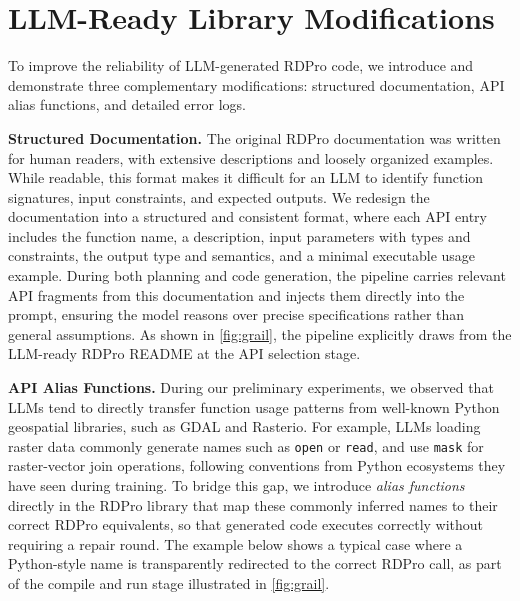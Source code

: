 \section{LLM-Ready Library Modifications}
\label{sec:mod}
To improve the reliability of LLM-generated RDPro code, we introduce and demonstrate three complementary modifications: structured documentation, API alias functions, and detailed error logs.

\textbf{Structured Documentation.}
The original RDPro documentation was written for human readers, with extensive descriptions and loosely organized examples. While readable, this format makes it difficult for an LLM to identify function signatures, input constraints, and expected outputs. We redesign the documentation into a structured and consistent format, where each API entry includes the function name, a description, input parameters with types and constraints, the output type and semantics, and a minimal executable usage example. During both planning and code generation, the pipeline carries relevant API fragments from this documentation and injects them directly into the prompt, ensuring the model reasons over precise specifications rather than general assumptions. As shown in \autoref{fig:grail}, the pipeline explicitly draws from the LLM-ready RDPro README at the API selection stage.

\textbf{API Alias Functions.}
During our preliminary experiments, we observed that LLMs tend to directly transfer function usage patterns from well-known Python geospatial libraries, such as GDAL and Rasterio. For example, LLMs loading raster data commonly generate names such as \texttt{open} or \texttt{read}, and use \texttt{mask} for raster-vector join operations, following conventions from Python ecosystems they have seen during training. To bridge this gap, we introduce \emph{alias functions} directly in the RDPro library that map these commonly inferred names to their correct RDPro equivalents, so that generated code executes correctly without requiring a repair round. The example below shows a typical case where a Python-style name is 
transparently redirected to the correct RDPro call, as part of the 
compile and run stage illustrated in \autoref{fig:grail}.


